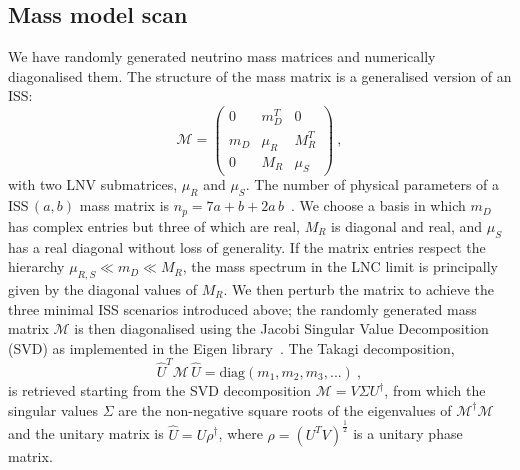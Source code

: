 \subsection{Mass model scan}

We have randomly generated neutrino mass matrices and numerically diagonalised them.
The structure of the mass matrix is a generalised version of an ISS:
\begin{equation}
	\mathcal{M} = 
	\begin{pmatrix}
		0	& m_D^T	& 0	\\
		m_D	& \mu_R	& M^T_R	\\
		0	& M_R	& \mu_S
	\end{pmatrix}\ ,
\end{equation}
with two LNV submatrices, $\mu_R$ and $\mu_S$.
The number of physical parameters of a ISS\,$(a,b)$ mass matrix is $n_p = 7a + b +2 a\,b$~\cite{Abada:2014vea}. %
We choose a basis in which $m_D$ has complex entries but three of which are real, $M_R$ is diagonal and real, and $\mu_S$ has a real diagonal %
without loss of generality.
If the matrix entries respect the hierarchy \mbox{$\mu_{R,S} \ll m_D \ll M_R$}, the mass spectrum in %
the LNC limit is principally given by the diagonal values of $M_R$.
We then perturb the matrix to achieve the three minimal ISS scenarios introduced above; %
the randomly generated mass matrix $\mathcal{M}$ %
is then diagonalised using the Jacobi Singular Value Decomposition (SVD) as implemented in the Eigen library~\cite{Eigen:2010}.
The Takagi decomposition, %
\begin{equation*}
	\hat{U}^T \mathcal{M}\, \hat{U} = \text{diag}(m_1, m_2, m_3, ...)\ ,
\end{equation*}
is retrieved starting from the SVD decomposition $\mathcal{M} = V \Sigma U^\dagger$, %
from which the singular values $\Sigma$ are the non-negative square roots of the eigenvalues of $\mathcal{M}^\dagger \mathcal{M}$ %
and the unitary matrix is $\hat{U} = U \rho^\dagger$, where $\rho = (U^T V)^\frac{1}{2}$ is a unitary phase matrix.

